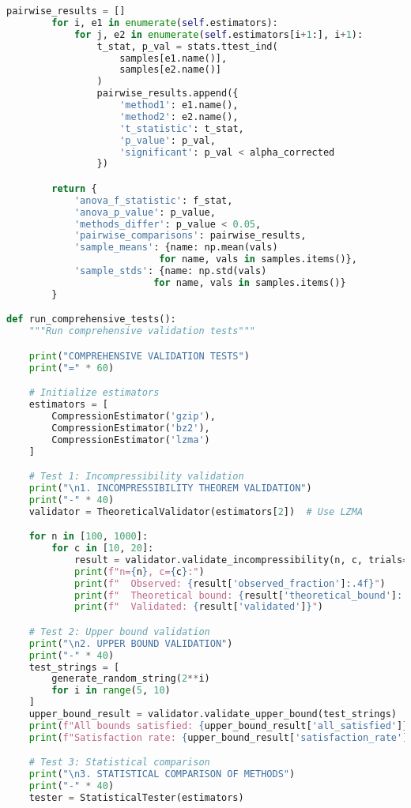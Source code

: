\documentclass[12pt,a4paper]{report}
\begin{document}
\begin{lstlisting}[language=Python, caption=Validation Testing Protocol]
        pairwise_results = []
        for i, e1 in enumerate(self.estimators):
            for j, e2 in enumerate(self.estimators[i+1:], i+1):
                t_stat, p_val = stats.ttest_ind(
                    samples[e1.name()],
                    samples[e2.name()]
                )
                pairwise_results.append({
                    'method1': e1.name(),
                    'method2': e2.name(),
                    't_statistic': t_stat,
                    'p_value': p_val,
                    'significant': p_val < alpha_corrected
                })

        return {
            'anova_f_statistic': f_stat,
            'anova_p_value': p_value,
            'methods_differ': p_value < 0.05,
            'pairwise_comparisons': pairwise_results,
            'sample_means': {name: np.mean(vals)
                           for name, vals in samples.items()},
            'sample_stds': {name: np.std(vals)
                          for name, vals in samples.items()}
        }

def run_comprehensive_tests():
    """Run comprehensive validation tests"""

    print("COMPREHENSIVE VALIDATION TESTS")
    print("=" * 60)

    # Initialize estimators
    estimators = [
        CompressionEstimator('gzip'),
        CompressionEstimator('bz2'),
        CompressionEstimator('lzma')
    ]

    # Test 1: Incompressibility validation
    print("\n1. INCOMPRESSIBILITY THEOREM VALIDATION")
    print("-" * 40)
    validator = TheoreticalValidator(estimators[2])  # Use LZMA

    for n in [100, 1000]:
        for c in [10, 20]:
            result = validator.validate_incompressibility(n, c, trials=100)
            print(f"n={n}, c={c}:")
            print(f"  Observed: {result['observed_fraction']:.4f}")
            print(f"  Theoretical bound: {result['theoretical_bound']:.4f}")
            print(f"  Validated: {result['validated']}")

    # Test 2: Upper bound validation
    print("\n2. UPPER BOUND VALIDATION")
    print("-" * 40)
    test_strings = [
        generate_random_string(2**i)
        for i in range(5, 10)
    ]
    upper_bound_result = validator.validate_upper_bound(test_strings)
    print(f"All bounds satisfied: {upper_bound_result['all_satisfied']}")
    print(f"Satisfaction rate: {upper_bound_result['satisfaction_rate']:.2%}")

    # Test 3: Statistical comparison
    print("\n3. STATISTICAL COMPARISON OF METHODS")
    print("-" * 40)
    tester = StatisticalTester(estimators)


\end{lstlisting}
\end{document}
